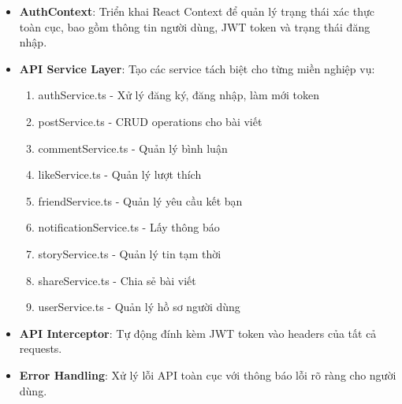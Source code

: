 \documentclass[a4paper]{article}
\begin{document}
    \begin{itemize}
        \item \textbf{AuthContext}: Triển khai React Context để quản lý trạng thái xác thực toàn cục, bao gồm thông tin người dùng, JWT token và trạng thái đăng nhập.
        \item \textbf{API Service Layer}: Tạo các service tách biệt cho từng miền nghiệp vụ:
        \begin{enumerate}
            \item authService.ts - Xử lý đăng ký, đăng nhập, làm mới token
            \item postService.ts - CRUD operations cho bài viết
            \item commentService.ts - Quản lý bình luận
            \item likeService.ts - Quản lý lượt thích
            \item friendService.ts - Quản lý yêu cầu kết bạn
            \item notificationService.ts - Lấy thông báo
            \item storyService.ts - Quản lý tin tạm thời
            \item shareService.ts - Chia sẻ bài viết
            \item userService.ts - Quản lý hồ sơ người dùng
        \end{enumerate}
        \item \textbf{API Interceptor}: Tự động đính kèm JWT token vào headers của tất cả requests.
        \item \textbf{Error Handling}: Xử lý lỗi API toàn cục với thông báo lỗi rõ ràng cho người dùng.
    \end{itemize}
\end{document}
